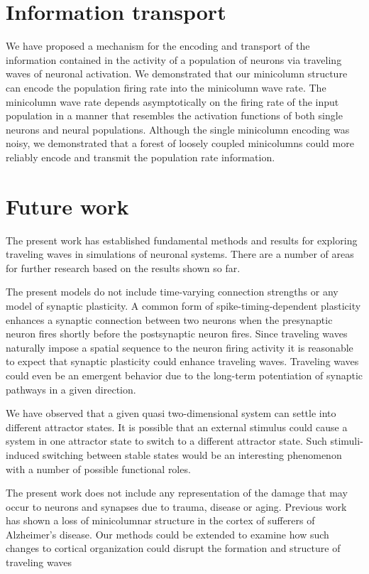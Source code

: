 \section{Information transport}
We have proposed a mechanism for the encoding and transport of the information contained in the activity of a population of neurons via traveling waves of neuronal activation.
We demonstrated that our minicolumn structure can encode the population firing rate into the minicolumn wave rate.
The minicolumn wave rate depends asymptotically on the firing rate of the input population in a manner that resembles the activation functions of both single neurons and neural populations. 
Although the single minicolumn encoding was noisy, we demonstrated that a forest of loosely coupled  minicolumns could more reliably encode and transmit the population rate information.

\section{Future work}
The present work has established fundamental methods and results for exploring traveling waves in simulations of neuronal systems.
There are a number of areas for further research based on the results shown so far.

The present models do not include time-varying connection strengths or any model of synaptic plasticity.
A common form of spike-timing-dependent plasticity enhances a synaptic connection between two neurons when the presynaptic neuron fires shortly before the postsynaptic neuron fires.
Since traveling waves naturally impose a spatial sequence to the neuron firing activity it is reasonable to expect that synaptic plasticity could enhance traveling waves.
Traveling waves could even be an emergent behavior due to the long-term potentiation of synaptic pathways in a given direction.

We have observed that a given quasi two-dimensional system can settle into different attractor states.
It is possible that an external stimulus could cause a system in one attractor state to switch to a different attractor state.
Such stimuli-induced switching between stable states would be an interesting phenomenon with a number of possible functional roles.

The present work does not include any representation of the damage that may occur to neurons and synapses due to trauma, disease or aging.
Previous work \citep{cruz2000} has shown a loss of minicolumnar structure in the cortex of sufferers of Alzheimer's disease.
Our methods could be extended to examine how such changes to cortical organization could disrupt the formation and structure of traveling waves

